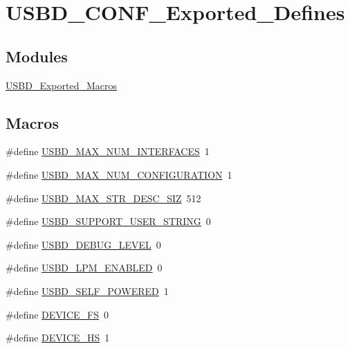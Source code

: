 \hypertarget{group__USBD__CONF__Exported__Defines}{}\section{U\+S\+B\+D\+\_\+\+C\+O\+N\+F\+\_\+\+Exported\+\_\+\+Defines}
\label{group__USBD__CONF__Exported__Defines}
\subsection*{Modules}
\begin{DoxyCompactItemize}
\item 
\hyperlink{group__USBD__Exported__Macros}{U\+S\+B\+D\+\_\+\+Exported\+\_\+\+Macros}
\end{DoxyCompactItemize}
\subsection*{Macros}
\begin{DoxyCompactItemize}
\item 
\#define \hyperlink{group__USBD__CONF__Exported__Defines_ga121d6d45e8011e1f372a365986126d0e}{U\+S\+B\+D\+\_\+\+M\+A\+X\+\_\+\+N\+U\+M\+\_\+\+I\+N\+T\+E\+R\+F\+A\+C\+ES}~1
\item 
\#define \hyperlink{group__USBD__CONF__Exported__Defines_gaef1f76fda5677f5ad43c25a2ba4ebcde}{U\+S\+B\+D\+\_\+\+M\+A\+X\+\_\+\+N\+U\+M\+\_\+\+C\+O\+N\+F\+I\+G\+U\+R\+A\+T\+I\+ON}~1
\item 
\#define \hyperlink{group__USBD__CONF__Exported__Defines_ga056ff3fee04cffde6a1ccccd566f8682}{U\+S\+B\+D\+\_\+\+M\+A\+X\+\_\+\+S\+T\+R\+\_\+\+D\+E\+S\+C\+\_\+\+S\+IZ}~512
\item 
\#define \hyperlink{group__USBD__CONF__Exported__Defines_ga7763658489a8c680428bd017dcc38dfd}{U\+S\+B\+D\+\_\+\+S\+U\+P\+P\+O\+R\+T\+\_\+\+U\+S\+E\+R\+\_\+\+S\+T\+R\+I\+NG}~0
\item 
\#define \hyperlink{group__USBD__CONF__Exported__Defines_gae7364a789408417d945d5ca96679ccf7}{U\+S\+B\+D\+\_\+\+D\+E\+B\+U\+G\+\_\+\+L\+E\+V\+EL}~0
\item 
\#define \hyperlink{group__USBD__CONF__Exported__Defines_ga61c094d920ba8d41bd826e6d51a3d80e}{U\+S\+B\+D\+\_\+\+L\+P\+M\+\_\+\+E\+N\+A\+B\+L\+ED}~0
\item 
\#define \hyperlink{group__USBD__CONF__Exported__Defines_ga07065dc40f090f051dd1dd6d5901930a}{U\+S\+B\+D\+\_\+\+S\+E\+L\+F\+\_\+\+P\+O\+W\+E\+R\+ED}~1
\item 
\#define \hyperlink{group__USBD__CONF__Exported__Defines_ga609db9b232fa154e9b1c86bcdd17e97c}{D\+E\+V\+I\+C\+E\+\_\+\+FS}~0
\item 
\#define \hyperlink{group__USBD__CONF__Exported__Defines_ga4743bb97c140c3615b999a81a0301815}{D\+E\+V\+I\+C\+E\+\_\+\+HS}~1
\end{DoxyCompactItemize}


